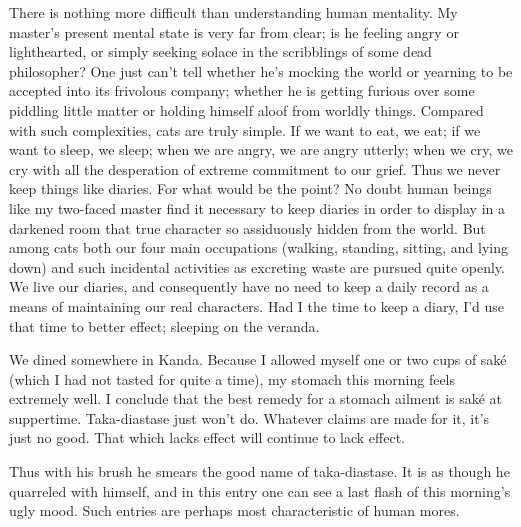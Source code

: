 \documentclass{book}
\begin{document}
There is nothing more difficult than understanding human mentality. My
master's present mental state is very far from clear; is he feeling
angry or lighthearted, or simply seeking solace in the scribblings of
some dead philosopher? One just can't tell whether he's mocking the
world or yearning to be accepted into its frivolous company; whether he
is getting furious over some piddling little matter or holding himself
aloof from worldly things. Compared with such complexities, cats are
truly simple. If we want to eat, we eat; if we want to sleep, we sleep;
when we are angry, we are angry utterly; when we cry, we cry with all
the desperation of extreme commitment to our grief. Thus we never keep
things like diaries. For what would be the point? No doubt human beings
like my two-faced master find it necessary to keep diaries in order to
display in a darkened room that true character so assiduously hidden
from the world. But among cats both our four main occupations (walking,
standing, sitting, and lying down) and such incidental activities as
excreting waste are pursued quite openly. We live our diaries, and
consequently have no need to keep a daily record as a means of
maintaining our real characters. Had I the time to keep a diary, I'd use
that time to better effect; sleeping on the veranda.

We dined somewhere in Kanda. Because I allowed myself one or two cups of
saké (which I had not tasted for quite a time), my stomach this morning
feels extremely well. I conclude that the best remedy for a stomach
ailment is saké at suppertime. Taka-diastase just won't do. Whatever
claims are made for it, it's just no good. That which lacks effect will
continue to lack effect.

Thus with his brush he smears the good name of taka-diastase. It is as
though he quarreled with himself, and in this entry one can see a last
flash of this morning's ugly mood. Such entries are perhaps most
characteristic of human mores.
\end{document}
